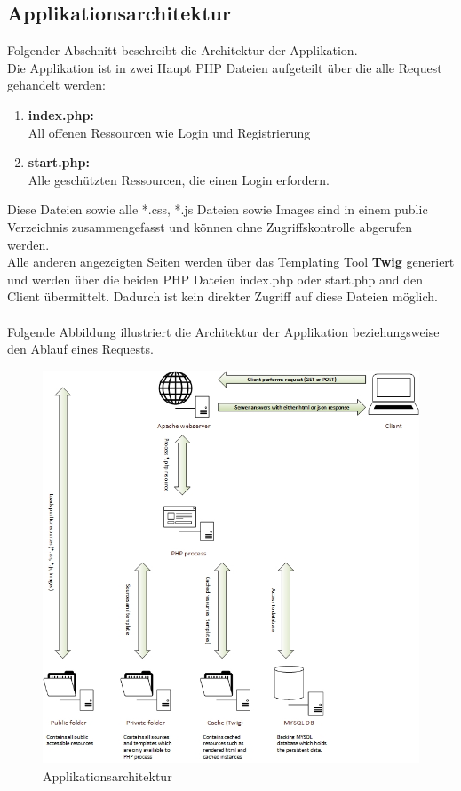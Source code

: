 \documentclass[11pt, a4paper, twoside]{article}   	%
\begin{document}
\subsection{Applikationsarchitektur}
Folgender Abschnitt beschreibt die Architektur der Applikation.\\
Die Applikation ist in zwei Haupt PHP Dateien aufgeteilt über die alle Request gehandelt werden:
\begin{enumerate}
	\item \textbf{index.php:} \\
	All offenen Ressourcen wie Login und Registrierung 
	\item \textbf{start.php:} \\
	Alle geschützten Ressourcen, die einen Login erfordern.
\end{enumerate}
Diese Dateien sowie alle *.css, *.js Dateien sowie Images sind in einem public Verzeichnis zusammengefasst und können ohne Zugriffskontrolle abgerufen werden.\\
Alle anderen angezeigten Seiten werden über das Templating Tool \textbf{Twig} generiert und werden über die beiden PHP Dateien index.php oder start.php and den Client übermittelt. Dadurch ist kein direkter Zugriff auf diese Dateien möglich.
\\\\
Folgende Abbildung illustriert die Architektur der Applikation beziehungsweise den Ablauf eines Requests. \\
\begin{figure}[h]
	\centering
	\includegraphics[scale=0.725]{images/Infrastructure.JPG}
	\caption
	{Applikationsarchitektur}
\end{figure}
\end{document}
